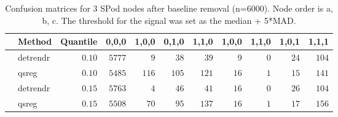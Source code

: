 \begin{table}[!tbp]
\caption{Confusion matrices for 3 SPod nodes after baseline 
      removal (n=6000). Node order is a, b, c. The threshold for the signal was 
      set as the median + 5*MAD.\label{confusion}} 
\begin{center}
\begin{tabular}{llrrrrrrrrr}
\hline\hline
\multicolumn{1}{l}{}&\multicolumn{1}{c}{Method}&\multicolumn{1}{c}{Quantile}&\multicolumn{1}{c}{0,0,0}&\multicolumn{1}{c}{1,0,0}&\multicolumn{1}{c}{0,1,0}&\multicolumn{1}{c}{1,1,0}&\multicolumn{1}{c}{1,0,0}&\multicolumn{1}{c}{1,1,0}&\multicolumn{1}{c}{1,0,1}&\multicolumn{1}{c}{1,1,1}\tabularnewline
\hline
&detrendr&$0.10$&$5777$&$  9$&$ 38$&$ 39$&$ 9$&$0$&$24$&$104$\tabularnewline
&qsreg&$0.10$&$5485$&$116$&$105$&$121$&$16$&$1$&$15$&$141$\tabularnewline
&detrendr&$0.15$&$5763$&$  4$&$ 46$&$ 41$&$16$&$0$&$26$&$104$\tabularnewline
&qsreg&$0.15$&$5508$&$ 70$&$ 95$&$137$&$16$&$1$&$17$&$156$\tabularnewline
\hline
\end{tabular}\end{center}
\end{table}
